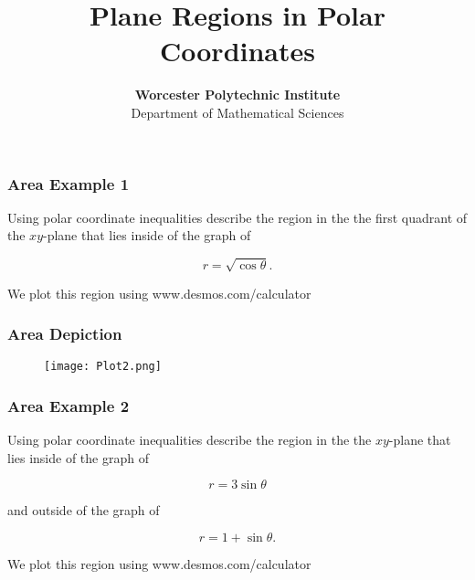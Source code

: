 \documentclass{beamer}
\title{Plane Regions in Polar Coordinates}
\author[Calculus Labs]{{\textbf{Worcester Polytechnic Institute}\\ Department of Mathematical Sciences}}
\institute[WPI]
{Calculus Labs}
\date{}
\begin{document}
\frame{\titlepage}




\begin{frame}
\frametitle{Area Example 1} 

Using polar coordinate inequalities describe the region in the the first quadrant of the $xy$-plane that lies inside of the graph of 

\begin{equation}
	r=\sqrt{\cos \theta}.
\end{equation}

\vspace{0.5 cm}
We plot this region using www.desmos.com/calculator



\vspace{6.5 cm}
\end{frame}





\begin{frame}
\frametitle{Area Depiction}

\begin{figure}[r]
 \raggedleft
	\texttt{[image: Plot2.png]}
\end{figure}


\vspace{6.5 cm}
\end{frame}





\begin{frame}
\frametitle{Area Example 2} 

Using polar coordinate inequalities describe the region in the the $xy$-plane that lies inside of the graph of 

\begin{equation}
	r=3\sin \theta
\end{equation}

  and outside of the graph of 

 \begin{equation} 
  	r=1+ \sin \theta.
\end{equation}


\vspace{0.5 cm}
We plot this region using www.desmos.com/calculator



\vspace{6.5 cm}
\end{frame}
\end{document}
